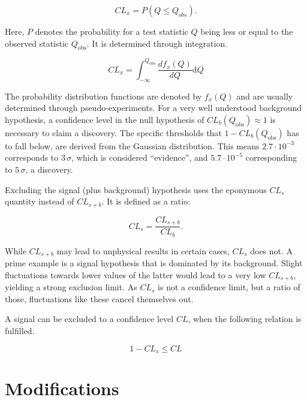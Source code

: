 \begin{equation}
  \label{eq:cl-prob}
  CL_x = P (Q \leq Q_{obs}).
\end{equation}

\noindent Here, $P$ denotes the probability for a test statistic $Q$ being less or equal to the observed statistic $Q_{\text{obs}}$. It is determined through integration.

\begin{equation}
  \label{eq:clx}
  CL_x = \int^{Q_{\text{obs}}}_{-\infty} \frac{d f_x(Q)}{d Q} \text{d} Q
\end{equation}

\noindent The probability distribution functions are denoted by $f_x(Q)$ and are usually determined through pseudo-experiments. For a very well understood background hypothesis, a confidence level in the null hypothesis of $CL_b (Q_{\text{obs}}) \approx 1$ is necessary to claim a discovery. The specific thresholds that $1 - CL_b (Q_{\text{obs}})$ has to fall below, are derived from the Gaussian distribution. This means $2.7 \cdot 10^{-3}$ corresponds to $3\,\sigma$, which is considered ``evidence'', and $5.7 \cdot 10^{-5}$ corresponding to $5\,\sigma$, a discovery.

Excluding the signal (plus background) hypothesis uses the eponymous $CL_s$ quantity instead of $CL_{s+b}$. It is defined as a ratio:

\begin{equation}
  \label{eq:cls}
  CL_s = \frac{CL_{s+b}}{CL_b}.
\end{equation}

\noindent While $CL_{s+b}$ may lead to unphysical results in certain cases, $CL_s$ does not. A prime example is a signal hypothesis that is dominated by its background. Slight fluctuations towards lower values of the latter would lead to a very low $CL_{s+b}$, yielding a strong exclusion limit. As $CL_s$ is not a confidence limit, but a ratio of those, fluctuations like these cancel themselves out.

A signal can be excluded to a confidence level $CL$, when the following relation is fulfilled.

\begin{equation}
  \label{eq:cl-excl}
  1 - CL_s \leq CL
\end{equation}

\section{Modifications}
\label{sec:mods}

